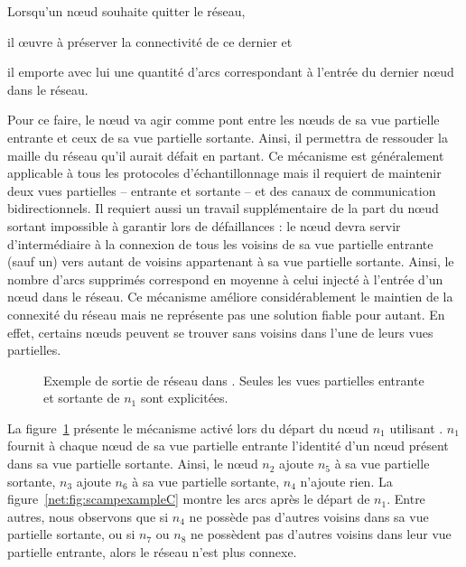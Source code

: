 \noindent Lorsqu'un nœud souhaite quitter le réseau,
\begin{inparaenum}[(i)]
\item il œuvre à préserver la connectivité de ce dernier et
\item il emporte avec lui une quantité d'arcs correspondant à l'entrée du
  dernier nœud dans le réseau.
\end{inparaenum}
Pour ce faire, le nœud va agir comme pont entre les nœuds de sa vue partielle
entrante et ceux de sa vue partielle sortante. Ainsi, il permettra de ressouder
la maille du réseau qu'il aurait défait en partant. Ce mécanisme est
généralement applicable à tous les protocoles d'échantillonnage mais il requiert
de maintenir deux vues partielles -- entrante et sortante -- et des canaux de
communication bidirectionnels. Il requiert aussi un travail supplémentaire de la
part du nœud sortant impossible à garantir lors de défaillances : le nœud devra
servir d'intermédiaire à la connexion de tous les voisins de sa vue partielle
entrante (sauf un) vers autant de voisins appartenant à sa vue partielle
sortante. Ainsi, le nombre d'arcs supprimés correspond en moyenne à celui
injecté à l'entrée d'un nœud dans le réseau. Ce mécanisme améliore
considérablement le maintien de la connexité du réseau mais ne représente pas
une solution fiable pour autant. En effet, certains nœuds peuvent se trouver
sans voisins dans l'une de leurs vues partielles.
  

\begin{figure}
  \centering
  \hspace{45pt}
  \caption[Protocole de sortie dans \SCAMP]
  {\label{net:fig:scampexample2} Exemple de sortie de réseau dans \SCAMP. Seules
    les vues partielles entrante et sortante de $n_1$ sont explicitées.}
\end{figure}

\noindent La figure~\ref{net:fig:scampexample2} présente le mécanisme activé
lors du départ du nœud $n_1$ utilisant \SCAMP. $n_1$ fournit à chaque nœud de sa
vue partielle entrante l'identité d'un nœud présent dans sa vue partielle
sortante. Ainsi, le nœud $n_2$ ajoute $n_5$ à sa vue partielle sortante, $n_3$
ajoute $n_6$ à sa vue partielle sortante, $n_4$ n'ajoute rien. La
figure~\ref{net:fig:scampexampleC} montre les arcs après le départ de
$n_1$. Entre autres, nous observons que si $n_4$ ne possède pas d'autres voisins
dans sa vue partielle sortante, ou si $n_7$ ou $n_8$ ne possèdent pas d'autres
voisins dans leur vue partielle entrante, alors le réseau n'est plus connexe.

